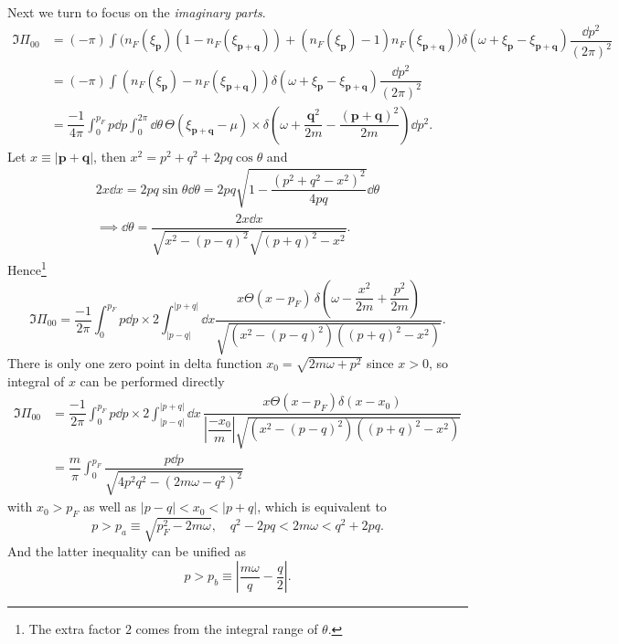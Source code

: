 \documentclass[bachelor,english,numbers]{ustcthesis}
\begin{document}
		Next we turn to focus on the \emph{imaginary parts}.
		\begin{align}
			\Im \Pi_{00}&=(-\pi)\int\bigg(n_F(\xi_{\bm{p}})(1-n_F(\xi_{\bm{p+q}}))+(n_F(\xi_{\bm{p}})-1)n_F(\xi_{\bm{p+q}})\bigg)\delta(\omega+\xi_{\bm{p}}-\xi_{\bm{p+q}})\dfrac{\dd p^2}{(2\pi)^2}\nonumber\\
			&=(-\pi)\int (n_F(\xi_{\bm{p}})-n_F(\xi_{\bm{p+q}}))\delta(\omega+\xi_{\bm{p}}-\xi_{\bm{p+q}})\dfrac{\dd p^2}{(2\pi)^2}\nonumber\\
			&=\dfrac{-1}{4\pi}\int_0^{p_F} p\dd p\int_0^{2\pi}\dd\theta\,\varTheta(\xi_{\bm{p+q}}-\mu)\times\delta\left(\omega+\dfrac{\bm{q}^2}{2m}-\dfrac{(\bm{p+q})^2}{2m}\right)\dd p^2.\label{3.2.9}
		\end{align}
		Let $x\equiv|\bm{p+q}|$, then $x^2=p^2+q^2+2pq\cos\theta$ and 
		\begin{align*}
			2x\dd x=2pq\sin\theta\dd\theta=2pq\sqrt{1-\dfrac{(p^2+q^2-x^2)^2}{4pq}}\dd\theta\\
			\implies\dd\theta=\dfrac{2x\dd x}{\sqrt{x^2-(p-q)^2}\sqrt{(p+q)^2-x^2}}.
		\end{align*}
		Hence\footnote{The extra factor $2$ comes from the integral range of $\theta$.}
		\begin{equation*}
			\Im \Pi_{00}=\dfrac{-1}{2\pi}\int_0^{p_F}p\dd p\times 2\int_{|p-q|}^{|p+q|}\dd x\dfrac{x\varTheta(x-p_F)\,\delta\left(\omega-\dfrac{x^2}{2m}+\dfrac{p^2}{2m}\right)}{\sqrt{(x^2-(p-q)^2)((p+q)^2-x^2)}}.
		\end{equation*}
		There is only one zero point in delta function $x_0=\sqrt{2m\omega+p^2}$ since $x>0$, so integral of $x$ can be performed directly
		\begin{align}
			\Im \Pi_{00}&=\dfrac{-1}{2\pi}\int_0^{p_F}p\dd p\times 2\int_{|p-q|}^{|p+q|}\dd x\,\dfrac{x\varTheta(x-p_F)\delta(x-x_0)}{\left|\dfrac{-x_0}{m}\right|\sqrt{(x^2-(p-q)^2)((p+q)^2-x^2)}}\nonumber\\
			&=\dfrac{m}{\pi}\int_0^{p_F}\dfrac{p\dd p}{\sqrt{4p^2q^2-(2m\omega-q^2)^2}}\label{3.2.10}
		\end{align}
		with $x_0>p_F$ as well as $|p-q|<x_0<|p+q|$, which is equivalent to
		\begin{equation*}
			p>p_a\equiv\sqrt{p_F^2-2m\omega},\quad q^2-2pq<2m\omega<q^2+2pq.
		\end{equation*}
		And the latter inequality can be unified as
		\begin{equation*}
			p>p_b\equiv\left|\dfrac{m\omega}{q}-\dfrac{q}{2}\right|.
		\end{equation*}
\end{document}

